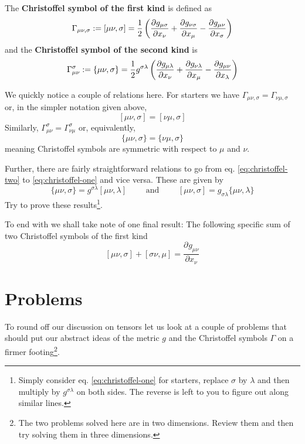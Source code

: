 \documentclass{tufte-handout}
\providecommand*{\pdif}[3][]{\frac{\partial^{#1}#2}{\partial #3^{#1}}}
\begin{document}
The \textbf{Christoffel symbol of the first kind} is defined as
\begin{equation}
	\Gamma_{\mu\nu,\sigma} := [\mu\nu , \sigma ] = {1\over 2} \left( {\partial g_{\mu\sigma}\over \partial x_\nu} + {\partial g_{\nu\sigma}\over \partial x_\mu} - {\partial g_{\mu\nu}\over \partial x_\sigma} \right) \label{eq:christoffel-one}
\end{equation}
and the \textbf{Christoffel symbol of the second kind} is
\begin{equation}
	\Gamma^\sigma_{\mu\nu} := \lbrace \mu\nu , \sigma \rbrace = {1\over 2} g^{\sigma\lambda} \left( {\partial g_{\mu\lambda}\over \partial x_\nu} + {\partial g_{\nu\lambda}\over \partial x_\mu} - {\partial g_{\mu\nu}\over \partial x_\lambda} \right) \label{eq:christoffel-two}
\end{equation}

We quickly notice a couple of relations here. For starters we have $\Gamma_{\mu\nu , \sigma} = \Gamma_{\nu\mu , \sigma}$ or, in the simpler notation given above,
\[ [\mu\nu , \sigma] = [\nu\mu , \sigma] \]
Similarly, $\Gamma^\sigma_{\mu\nu} = \Gamma^\sigma_{\nu\mu}$ or, equivalently,
\[ \lbrace \mu\nu , \sigma \rbrace = \{ \nu\mu , \sigma \} \]
meaning Christoffel symbols are symmetric with respect to $\mu$ and $\nu$.

Further, there are fairly straightforward relations to go from eq. \eqref{eq:christoffel-two} to \eqref{eq:christoffel-one} and vice versa. These are given by
\[ \{ \mu\nu , \sigma \} = g^{\sigma\lambda} [\mu\nu , \lambda ] \qquad \textrm{ and } \qquad [ \mu\nu , \sigma ] = g_{\sigma\lambda} \{ \mu\nu , \lambda \} \]
Try to prove these results\footnote{Simply consider eq. \eqref{eq:christoffel-one} for starters, replace $\sigma$ by $\lambda$ and then multiply by $g^{\sigma\lambda}$ on both sides. The reverse is left to you to figure out along similar lines.}.

To end with we shall take note of one final result: The following specific sum of two Christoffel symbols of the first kind \[ [\mu\nu , \sigma] + [\sigma\nu , \mu] = \pdif{g_{\mu\nu}}{x_\nu} \]

\section{Problems}

To round off our discussion on tensors let us look at a couple of problems that should put our abstract ideas of the metric $g$ and the Christoffel symbols $\Gamma$ on a firmer footing\footnote{The two problems solved here are in two dimensions. Review them and then try solving them in three dimensions.}.
\end{document}
